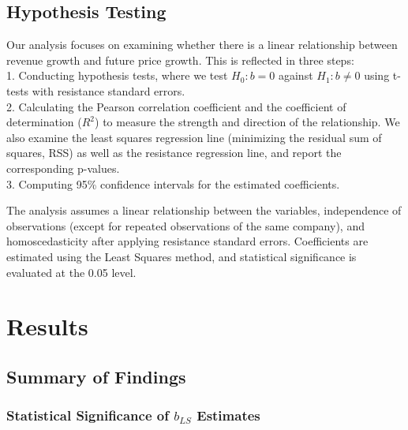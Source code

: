 \documentclass[11pt]{article}
\begin{document}


\subsection{Hypothesis Testing}

Our analysis focuses on examining whether there is a linear relationship between revenue growth and future price growth. This is reflected in three steps:  
\\ 1. Conducting hypothesis tests, where we test \( H_0: b = 0 \) against \( H_1: b \neq 0 \) using t-tests with resistance standard errors.
\\ 2. Calculating the Pearson correlation coefficient and the coefficient of determination (\(R^2\)) to measure the strength and direction of the relationship. We also examine the least squares regression line (minimizing the residual sum of squares, RSS) as well as the resistance regression line, and report the corresponding p-values.
\\ 3. Computing 95\% confidence intervals for the estimated coefficients.

The analysis assumes a linear relationship between the variables, independence of observations (except for repeated observations of the same company), and homoscedasticity after applying resistance standard errors. Coefficients are estimated using the Least Squares method, and statistical significance is evaluated at the 0.05 level.


\section{Results}

\subsection{Summary of Findings}

\subsubsection{Statistical Significance of $b_{LS}$ Estimates}
\end{document}
